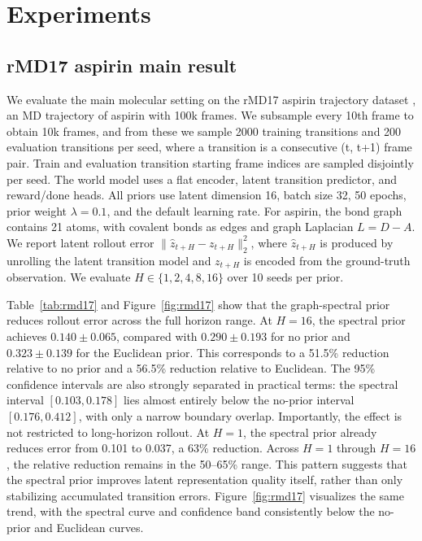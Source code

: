 \section{Experiments}\label{sec:experiments}

\subsection{rMD17 aspirin main result}\label{sec:rmd17}

We evaluate the main molecular setting on the rMD17 aspirin trajectory dataset \cite{chmiela2017}, an MD trajectory of aspirin with 100k frames. We subsample every 10th frame to obtain 10k frames, and from these we sample 2000 training transitions and 200 evaluation transitions per seed, where a transition is a consecutive (t, t+1) frame pair. Train and evaluation transition starting frame indices are sampled disjointly per seed. The world model uses a flat encoder, latent transition predictor, and reward/done heads. All priors use latent dimension 16, batch size 32, 50 epochs, prior weight \(\lambda=0.1\), and the default learning rate. For aspirin, the bond graph contains 21 atoms, with covalent bonds as edges and graph Laplacian \(L=D-A\). We report latent rollout error \(\|\hat{z}_{t+H}-z_{t+H}\|_2^2\), where \(\hat{z}_{t+H}\) is produced by unrolling the latent transition model and \(z_{t+H}\) is encoded from the ground-truth observation. We evaluate \(H \in \{1,2,4,8,16\}\) over 10 seeds per prior.

Table~\ref{tab:rmd17} and Figure~\ref{fig:rmd17} show that the graph-spectral prior reduces rollout error across the full horizon range. At \(H=16\), the spectral prior achieves \(0.140 \pm 0.065\), compared with \(0.290 \pm 0.193\) for no prior and \(0.323 \pm 0.139\) for the Euclidean prior. This corresponds to a 51.5\% reduction relative to no prior and a 56.5\% reduction relative to Euclidean. The 95\% confidence intervals are also strongly separated in practical terms: the spectral interval \([0.103, 0.178]\) lies almost entirely below the no-prior interval \([0.176, 0.412]\), with only a narrow boundary overlap. Importantly, the effect is not restricted to long-horizon rollout. At \(H=1\), the spectral prior already reduces error from 0.101 to 0.037, a 63\% reduction. Across \(H=1\) through \(H=16\), the relative reduction remains in the 50--65\% range. This pattern suggests that the spectral prior improves latent representation quality itself, rather than only stabilizing accumulated transition errors. Figure~\ref{fig:rmd17} visualizes the same trend, with the spectral curve and confidence band consistently below the no-prior and Euclidean curves.

